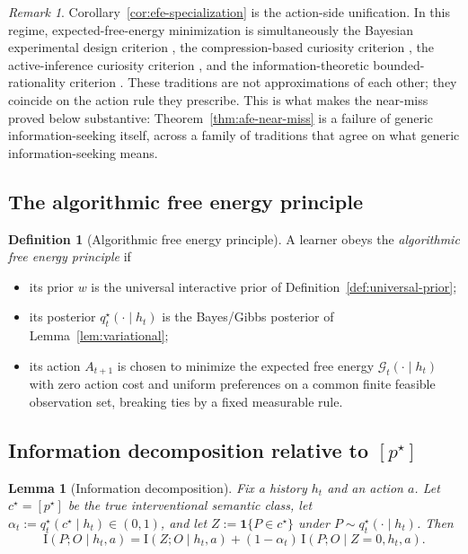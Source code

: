 \documentclass[11pt]{article}
\newtheorem{lemma}[theorem]{Lemma}
\theoremstyle{definition}
\newtheorem{definition}[theorem]{Definition}
\theoremstyle{remark}
\newtheorem{remark}[theorem]{Remark}
\newcommand{\Gcal}{\mathcal{G}}
\newcommand{\I}{\mathrm{I}}
\newcommand{\one}{\mathbf{1}}
\begin{document}
\begin{remark}
\label{rem:efe-unification}
Corollary~\ref{cor:efe-specialization} is the action-side unification. In this regime, expected-free-energy minimization is simultaneously the Bayesian experimental design criterion \citep{Lindley1956,ChalonerVerdinelli1995,MacKay1992}, the compression-based curiosity criterion \citep{Schmidhuber1991,Schmidhuber2010}, the active-inference curiosity criterion \citep{FristonEtAl2017Curiosity}, and the information-theoretic bounded-rationality criterion \citep{OrtegaBraun2011,OrtegaBraun2013}. These traditions are not approximations of each other; they coincide on the action rule they prescribe. This is what makes the near-miss proved below substantive: Theorem~\ref{thm:afe-near-miss} is a failure of generic information-seeking itself, across a family of traditions that agree on what generic information-seeking means.
\end{remark}

\subsection{The algorithmic free energy principle}

\begin{definition}[Algorithmic free energy principle]
\label{def:afe-principle}
A learner obeys the \emph{algorithmic free energy principle} if
\begin{itemize}
\item[(i)] its prior $w$ is the universal interactive prior of Definition~\ref{def:universal-prior};
\item[(ii)] its posterior $q_t^\star(\cdot\mid h_t)$ is the Bayes/Gibbs posterior of Lemma~\ref{lem:variational};
\item[(iii)] its action $A_{t+1}$ is chosen to minimize the expected free energy $\Gcal_t(\cdot\mid h_t)$ with zero action cost and uniform preferences on a common finite feasible observation set, breaking ties by a fixed measurable rule.
\end{itemize}
\end{definition}

\subsection{Information decomposition relative to $[p^\star]$}

\begin{lemma}[Information decomposition]
\label{lem:info-decomp}
Fix a history $h_t$ and an action $a$. Let $c^\star=[p^\star]$ be the true interventional semantic class, let $\alpha_t:=q_t^\star(c^\star\mid h_t)\in(0,1)$, and let $Z:=\one\{P\in c^\star\}$ under $P\sim q_t^\star(\cdot\mid h_t)$. Then
\[
\I(P;O\mid h_t,a)
=
\I(Z;O\mid h_t,a)+(1-\alpha_t)\,\I(P;O\mid Z=0,h_t,a).
\]
\end{lemma}
\end{document}
